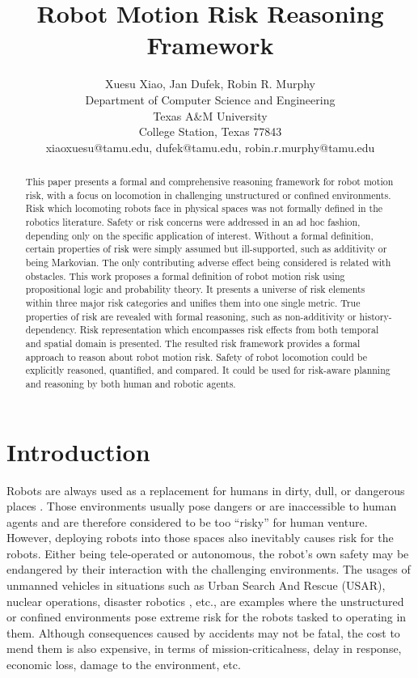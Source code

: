 \documentclass[letterpaper]{article} %
\title{Robot Motion Risk Reasoning Framework}
\author{Xuesu Xiao, Jan Dufek, Robin R. Murphy\\ %
Department of Computer Science and Engineering\\Texas A\&M University\\ %
College Station, Texas 77843\\
xiaoxuesu@tamu.edu, dufek@tamu.edu, robin.r.murphy@tamu.edu %
}
\begin{document}
\maketitle

\begin{abstract}
This paper presents a formal and comprehensive reasoning framework for robot motion risk, with a focus on locomotion in challenging unstructured or confined environments. Risk which locomoting robots face in physical spaces was not formally defined in the robotics literature. Safety or risk concerns were addressed in an ad hoc fashion, depending only on the specific application of interest. Without a formal definition, certain properties of risk were simply assumed but ill-supported, such as additivity or being Markovian. The only contributing adverse effect being considered is related with obstacles. This work proposes a formal definition of robot motion risk using propositional logic and probability theory. It presents a universe of risk elements within three major risk categories and unifies them into one single metric. True properties of risk are revealed with formal reasoning, such as non-additivity or history-dependency. Risk representation which encompasses risk effects from both temporal and spatial domain is presented. The resulted risk framework provides a formal approach to reason about robot motion risk. Safety of robot locomotion could be explicitly reasoned, quantified, and compared. It could be used for risk-aware planning and reasoning by both human and robotic agents.
\end{abstract}

\section{Introduction}
Robots are always used as a replacement for humans in dirty, dull, or dangerous places \cite{murphy2000introduction}. Those environments usually pose dangers or are inaccessible to human agents and are therefore considered to be too ``risky'' for human venture. However, deploying robots into those spaces also inevitably causes risk for the robots. Either being tele-operated or autonomous, the robot's own safety may be endangered by their interaction with the challenging environments. The usages of unmanned vehicles in situations such as Urban Search And Rescue (USAR), nuclear operations, disaster robotics \cite{murphy2014disaster}, etc., are examples where the unstructured or confined environments pose extreme risk for the robots tasked to operating in them. Although consequences caused by accidents may not be fatal, the cost to mend them is also expensive, in terms of mission-criticalness, delay in response, economic loss, damage to the environment, etc.
\end{document}

